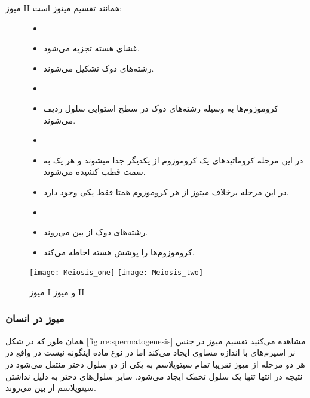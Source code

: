 \noindent
میوز
\RN{2}
همانند تقسیم میتوز است:
\begin{description}
\item[]
\begin{itemize}
\item[]
\item غشای هسته تجزیه می‌شود.
\item رشته‌های دوک تشکیل می‌شوند.
\end{itemize}
\item[]
\begin{itemize}
\item[]
\item کروموزوم‌ها به وسیله رشته‌های دوک در سطح استوایی سلول ردیف می‌شوند.
\end{itemize}
\item[]
\begin{itemize}
\item[]
\item در این مرحله کروماتید‌های یک کروموزوم از یکدیگر جدا میشوند و هر یک به سمت قطب کشیده‌ می‌شوند.
\item در این مرحله برخلاف میتوز از هر کروموزوم‌ همتا فقط یکی وجود دارد.
\end{itemize}
\item[]
\begin{itemize}
\item[]
\item رشته‌های دوک از بین می‌روند.
\item کروموزوم‌ها را پوشش هسته احاطه می‌کند.
\end{itemize}
\end{description}

\begin{figure}[htbp]
	\centering
	\texttt{[image: Meiosis\_one]}
	\texttt{[image: Meiosis\_two]}
	\caption{میوز
	\RN{1}
	و
	میوز
	\RN{2}}
\end{figure}

\pagebreak
\subsubsection{میوز در انسان}

همان طور که در شکل
\ref{figure:spermatogenesis}
مشاهده می‌کنید تقسیم میوز در جنس نر اسپرم‌های با اندازه مساوی ایجاد می‌کند اما در نوع ماده اینگونه نیست در واقع در هر دو مرحله از میوز تقریبا تمام سیتوپلاسم به یکی از دو سلول دختر منتقل می‌شود در نتیجه در انتها تنها یک سلول تخمک ایجاد می‌شود. سایر سلول‌های دختر به دلیل نداشتن سیتوپلاسم از بین می‌روند.

